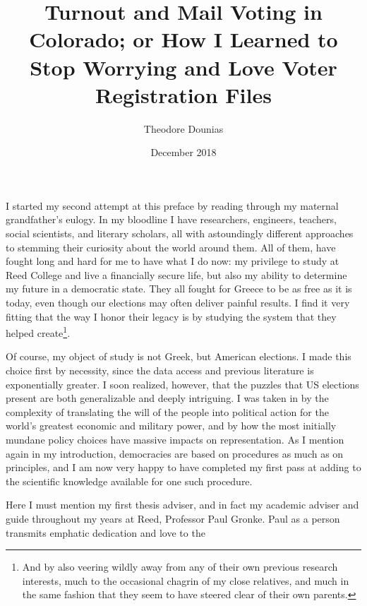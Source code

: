 \documentclass[12pt,twoside]{reedthesis}
\title{Turnout and Mail Voting in Colorado; or How I Learned to Stop Worrying
and Love Voter Registration Files}
\author{Theodore Dounias}
\date{December 2018}
\begin{document}
      \maketitle
  
  \frontmatter %
  \pagestyle{empty} %

  
      \begin{preface}
      I started my second attempt at this preface by reading through my
      maternal grandfather's eulogy. In my bloodline I have researchers,
      engineers, teachers, social scientists, and literary scholars, all with
      astoundingly different approaches to stemming their curiosity about the
      world around them. All of them, have fought long and hard for me to have
      what I do now: my privilege to study at Reed College and live a
      financially secure life, but also my ability to determine my future in a
      democratic state. They all fought for Greece to be as free as it is
      today, even though our elections may often deliver painful results. I
      find it very fitting that the way I honor their legacy is by studying
      the system that they helped create\footnote{And by also veering wildly
        away from any of their own previous research interests, much to the
        occasional chagrin of my close relatives, and much in the same fashion
        that they seem to have steered clear of their own parents.}. \par Of
      course, my object of study is not Greek, but American elections. I made
      this choice first by necessity, since the data access and previous
      literature is exponentially greater. I soon realized, however, that the
      puzzles that US elections present are both generalizable and deeply
      intriguing. I was taken in by the complexity of translating the will of
      the people into political action for the world's greatest economic and
      military power, and by how the most initially mundane policy choices
      have massive impacts on representation. As I mention again in my
      introduction, democracies are based on procedures as much as on
      principles, and I am now very happy to have completed my first pass at
      adding to the scientific knowledge available for one such procedure.
      \par Here I must mention my first thesis adviser, and in fact my
      academic adviser and guide throughout my years at Reed, Professor Paul
      Gronke. Paul as a person transmits emphatic dedication and love to the

\end{preface}
\end{document}
